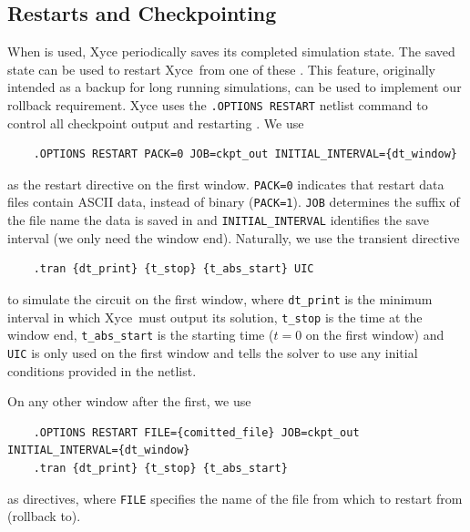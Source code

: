 \subsection{Restarts and Checkpointing} \label{sec:xyce-restarts}
When  is used, Xyce periodically saves its completed simulation state. The saved state can be used to restart Xyce\texttrademark \ from one of these . This feature, originally intended as a backup for long running simulations, can be used to implement our rollback requirement.
Xyce uses the \lstinline|.OPTIONS RESTART| netlist command to control all checkpoint output and restarting \cite{Keiter2025UG}. We use
\begin{lstlisting}
    .OPTIONS RESTART PACK=0 JOB=ckpt_out INITIAL_INTERVAL={dt_window}
\end{lstlisting}
as the restart directive on the first window. \lstinline|PACK=0| indicates that restart data files contain ASCII data, instead of binary (\lstinline|PACK=1|). \lstinline|JOB| determines the suffix of the file name the data is saved in and \lstinline|INITIAL_INTERVAL| identifies the save interval (we only need the window end).
Naturally, we use the transient directive
\begin{lstlisting}
    .tran {dt_print} {t_stop} {t_abs_start} UIC
\end{lstlisting}
to simulate the circuit on the first window, where \lstinline|dt_print| is the minimum interval in which Xyce\texttrademark \ must output its solution, \lstinline|t_stop| is the time at the window end, \lstinline|t_abs_start| is the starting time ($t=0$ on the first window) and \lstinline|UIC| is only used on the first window and tells the solver to use any initial conditions provided in the netlist.

On any other window after the first, we use
\begin{lstlisting}
    .OPTIONS RESTART FILE={comitted_file} JOB=ckpt_out INITIAL_INTERVAL={dt_window}
    .tran {dt_print} {t_stop} {t_abs_start}
\end{lstlisting}
as directives, where \lstinline|FILE| specifies the name of the file from which to restart from (rollback to).

